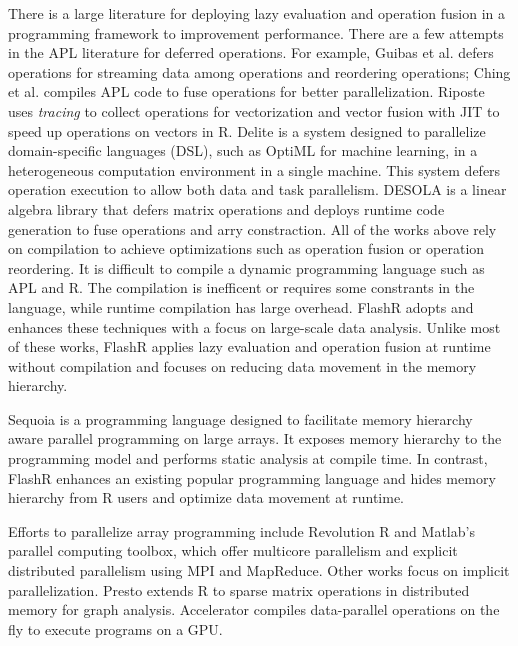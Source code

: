 There is a large literature for deploying lazy evaluation and operation fusion
in a programming framework to improvement performance. There are a few attempts
in the APL literature for deferred operations. For example, Guibas et al.
\cite{Guibas78} defers operations for streaming data among operations and
reordering operations; Ching et al. \cite{Ching12} compiles APL code
to fuse operations for better parallelization. Riposte \cite{riposte} uses
\textit{tracing} to collect operations for vectorization and vector fusion
with JIT to speed up operations on vectors in R.
Delite \cite{delite} is a system designed to parallelize domain-specific languages
(DSL), such as OptiML \cite{optiml} for machine learning, in a heterogeneous
computation environment in a single machine. This system
defers operation execution to allow both data and task parallelism.
DESOLA \cite{desola} is a linear algebra library that defers matrix operations
and deploys runtime code generation to fuse operations and arry constraction.
All of the works above rely on compilation to achieve optimizations such as
operation fusion or operation reordering.
It is difficult to compile a dynamic programming language such as APL and R.
The compilation is inefficent or requires some constrants in the language,
while runtime compilation has large overhead.
FlashR adopts and enhances these techniques with a focus on large-scale
data analysis. Unlike most of these works, FlashR applies lazy evaluation
and operation fusion at runtime without compilation and focuses on reducing
data movement in the memory hierarchy.

Sequoia \cite{sequoia} is a programming language designed to facilitate
memory hierarchy aware parallel programming on large arrays.
It exposes memory hierarchy to the programming model and performs static
analysis at compile time. In contrast, FlashR enhances an existing popular
programming language and hides memory
hierarchy from R users and optimize data movement at runtime.

Efforts to parallelize array programming include Revolution R \cite{rro} and
Matlab's parallel computing toolbox, which offer multicore parallelism and
explicit distributed parallelism using MPI and MapReduce. Other works focus
on implicit parallelization. Presto \cite{presto} extends R to sparse matrix
operations in distributed memory for graph analysis. Accelerator
\cite{accelerator} compiles
data-parallel operations on the fly to execute programs on a GPU.
